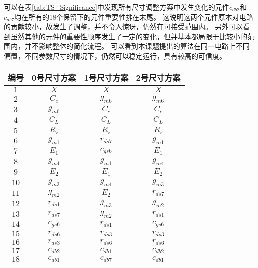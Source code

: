 可以在表\ref{tab:TS_Significance}中发现所有尺寸调整方案中发生变化的元件$c_{db2}$和$c_{db7}$均在所有的18个保留下的元件重要性排在末尾。
这说明这两个元件原本对电路的贡献较小，故发生了调整，并不令人惊讶，仍然在可接受范围内。
另外可以看到虽然其他的元件的重要性顺序发生了一定的变化，但并基本都局限于比较小的范围内，并不影响整体的简化流程。
可以看到本课题提出的算法在同一电路上不同偏置，不同参数尺寸的情况下，仍然可以稳定运行，具有较高的可信度。

\begin{table}[!htbp]
	\centering
	\begin{tabular}{c|c|c|c}
		\hline
		 编号  &  0号尺寸方案   &  1号尺寸方案   &  2号尺寸方案   \\ \hline
		$1$  &    $X$    &    $X$    &    $X$    \\
		$2$  &  $C_{c}$  & $g_{m6}$  & $g_{m6}$  \\
		$3$  & $g_{m6}$  &  $C_{c}$  &  $C_{c}$  \\
		$4$  &  $C_{L}$  &  $C_{L}$  &  $C_{L}$  \\
		$5$  &  $R_{z}$  &  $R_{z}$  &  $R_{z}$  \\
		$6$  & $g_{m1}$  & $r_{ds7}$ & $g_{m1}$  \\
		$7$  &  $E_{1}$  & $c_{gs6}$ &  $E_{1}$  \\
		$8$  & $g_{m4}$  & $g_{m1}$  & $g_{m4}$  \\
		$9$  &  $E_{2}$  &  $E_{1}$  &  $E_{2}$  \\
		$10$ & $g_{m3}$  & $g_{m4}$  & $g_{m3}$  \\
		$11$ & $g_{m2}$  &  $E_{2}$  & $r_{ds7}$ \\
		$12$ & $r_{ds1}$ & $g_{m3}$  & $g_{m2}$  \\
		$13$ & $r_{ds7}$ & $g_{m2}$  & $r_{ds1}$ \\
		$14$ & $c_{gs6}$ & $r_{ds1}$ & $c_{gs6}$ \\
		$15$ & $r_{ds6}$ & $r_{ds3}$ & $r_{ds3}$ \\
		$16$ & $r_{ds3}$ & $r_{ds6}$ & $r_{ds6}$ \\
		$17$ & $c_{db2}$ & $c_{db1}$ & $c_{db2}$ \\
		$18$ & $c_{db1}$ & $c_{db7}$ & $c_{db1}$ \\ \hline
	\end{tabular}
\end{table}

